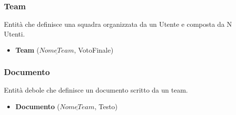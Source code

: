 \documentclass[a4paper, 10pt]{article}
\begin{document}
	\subsubsection{Team}
	Entità che definisce una squadra organizzata da un Utente e composta da N Utenti.
	\begin{itemize}
		\item \textbf{Team} ($\underline{NomeTeam}$, VotoFinale)
	\end{itemize}
	\subsubsection{Documento}
	Entità debole che definisce un documento scritto da un team.
	\begin{itemize}
		\item \textbf{Documento} ($\underline{NomeTeam}$, Testo)
	\end{itemize}
\end{document}
